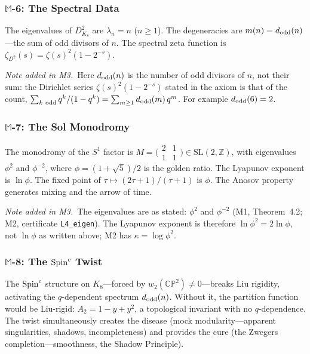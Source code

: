 \subsubsection*{$\mathbb{M}$-6: The Spectral Data}
\par\smallskip
The eigenvalues of $D^2_{K_8}$ are $\lambda_n = n$ ($n \geq 1$).  The degeneracies are $m(n) = d_{\mathrm{odd}}(n)$---the sum of odd divisors of $n$.  The spectral zeta function is $\zeta_{D^2}(s) = \zeta(s)^2(1-2^{-s})$.

\noindent\emph{Note added in M3.}\ Here $d_{\mathrm{odd}}(n)$ is the number of odd divisors of $n$, not their sum: the Dirichlet series $\zeta(s)^{2}(1-2^{-s})$ stated in the axiom is that of the count, $\sum_{k\ \mathrm{odd}}q^{k}/(1-q^{k})=\sum_{m\geq1}\dodd(m)\,q^{m}$. For example $d_{\mathrm{odd}}(6)=2$.

\subsubsection*{$\mathbb{M}$-7: The Sol Monodromy}
\par\smallskip
The monodromy of the $S^1$ factor is $M = \bigl(\begin{smallmatrix} 2 & 1 \\ 1 & 1 \end{smallmatrix}\bigr) \in \mathrm{SL}(2,\mathbb{Z})$, with eigenvalues $\phi^2$ and $\phi^{-2}$, where $\phi = (1+\sqrt{5})/2$ is the golden ratio.  The Lyapunov exponent is $\ln\phi$.  The fixed point of $\tau \mapsto (2\tau+1)/(\tau+1)$ is $\phi$.  The Anosov property generates mixing and the arrow of time.

\noindent\emph{Note added in M3.}\ The eigenvalues are as stated: $\phi^{2}$ and $\phi^{-2}$ (M1, Theorem~4.2; M2, certificate \texttt{L4\_eigen}). The Lyapunov exponent is therefore $\ln\phi^{2}=2\ln\phi$, not $\ln\phi$ as written above; M2 has $\kappa=\log\phi^{2}$.

\subsubsection*{$\mathbb{M}$-8: The $\text{Spin}^c$ Twist}
\par\smallskip
The $\text{Spin}^c$ structure on $K_8$---forced by $w_2(\mathbb{CP}^2) \neq 0$---breaks Liu rigidity, activating the $q$-dependent spectrum $d_{\mathrm{odd}}(n)$.  Without it, the partition function would be Liu-rigid: $A_2 = 1 - y + y^2$, a topological invariant with no $q$-dependence.  The twist simultaneously creates the disease (mock modularity---apparent singularities, shadows, incompleteness) and provides the cure (the Zwegers completion---smoothness, the Shadow Principle).

\endgroup

